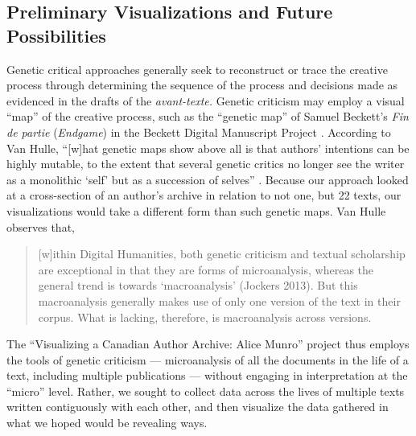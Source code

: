 \begin{paper}
\subsection*{Preliminary Visualizations and Future Possibilities}

Genetic critical approaches generally seek to reconstruct or trace the
creative process through determining the sequence of the process and
decisions made as evidenced in the drafts of the \emph{avant-texte.}
Genetic criticism may employ a visual ``map'' of the creative process,
such as the ``genetic map'' of Samuel Beckett's \emph{Fin de partie}
(\emph{Endgame}) in the Beckett Digital Manuscript Project \citep[11]{van_hulle_genetic_2022}. According to Van Hulle, ``{[}w{]}hat genetic maps show above all is
that authors' intentions can be highly mutable, to the extent that
several genetic critics no longer see the writer as a monolithic `self'
but as a succession of selves'' \citep[11]{van_hulle_genetic_2022}. Because our approach looked at a
cross-section of an author's archive in relation to not one, but 22
texts, our visualizations would take a different form than such genetic
maps. Van Hulle observes that,

\begin{quote}
{[}w{]}ithin Digital Humanities, both genetic criticism and textual
scholarship are exceptional in that they are forms of microanalysis, whereas the general trend is towards `macroanalysis' (Jockers 2013). But this macroanalysis
generally makes use of only one version of the text in their corpus. What is lacking,
therefore, is macroanalysis across versions. 

\begin{flushright}
    \parencite[176--77]{van_hulle_genetic_2022}
\end{flushright}
\end{quote}

The ``Visualizing a Canadian Author Archive: Alice Munro'' project thus
employs the tools of genetic criticism –– microanalysis of all the
documents in the life of a text, including multiple
publications –– without engaging in interpretation at the ``micro''
level. Rather, we sought to collect data across the lives of multiple
texts written contiguously with each other, and then visualize the data
gathered in what we hoped would be revealing ways.


\end{paper}

